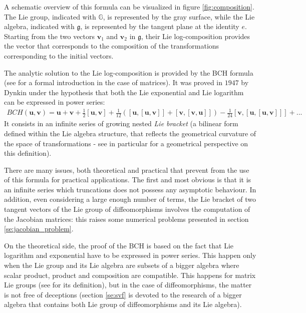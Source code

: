 A schematic overview of this formula can be visualized in figure \ref{fig:composition}. The Lie group, indicated with $\mathbb{G}$, is represented by the gray surface, while the Lie algebra, indicated with $\mathfrak{g}$, is represented by the tangent plane at the identity $e$.
Starting from the two vectors $\mathbf{v}_1$ and $\mathbf{v}_2$ in $\mathfrak{g}$, their Lie log-composition provides the vector that corresponds to the composition of the transformations corresponding to the initial vectors. 

The analytic solution to the Lie log-composition is provided by the BCH formula (see \cite{hall2015lie} for a formal introduction in the case of matrices). It was proved in $1947$ by Dynkin \cite{dynkin1947calculation} under the hypothesis that both the Lie exponential and Lie logarithm can be expressed in power series:
\begin{align*}
BCH(\mathbf{u},\mathbf{v}) 
= 
\mathbf{u} + \mathbf{v} + \frac{1}{2}[\mathbf{u},\mathbf{v}] + \frac{1}{12}([\mathbf{u},[\mathbf{u},\mathbf{v}]]
+ [\mathbf{v},[\mathbf{v},\mathbf{u}]]) - \frac{1}{24}[\mathbf{v},[\mathbf{u},[\mathbf{u},\mathbf{v}]]] +... 
\end{align*}
It consists in an infinite series of growing nested \emph{Lie bracket} (a bilinear form defined within the Lie algebra structure, that reflects the geometrical curvature of the space of transformations - see in particular \cite{misner1973gravitation} for a geometrical perspective on this definition).

There are many issues, both theoretical and practical that prevent from the use of this formula for practical applications. The first and most obvious is that it is an infinite series which truncations does not possess any asymptotic behaviour.
In addition, even considering a large enough number of terms, the Lie bracket of two tangent vectors of the Lie group of diffeomorphisms involves the computation of the Jacobian matrices: this raises some numerical problems presented in section \ref{se:jacobian_problem}.

On the theoretical side, the proof of the BCH is based on the fact that Lie logarithm and exponential have to be expressed in power series. This happen only when the Lie group and its Lie algebra are subsets of a bigger algebra where scalar product, product and composition are compatible. This happens for matrix Lie groups (see \cite{hall2015lie} for its definition), but in the case of diffeomorphisms, the matter is not free of deceptions (section \ref{se:svf} is devoted to the research of a bigger algebra that contains both Lie group of diffeomorphisms and its Lie algebra).
 
